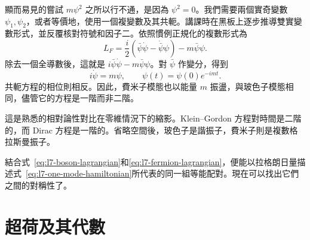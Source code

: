 \begin{classroomqa}
\end{classroomqa}

顯而易見的嘗試 \(m\psi^2\) 之所以行不通，是因為 \(\psi^2=0\)。我們需要兩個實奇變數 \(\psi_1,\psi_2\)，或者等價地，使用一個複變數及其共軛。講課時在黑板上逐步推導雙實變數形式，並反覆核對符號和因子二。依照慣例正規化的複數形式為
\begin{equation}
L_F=\frac{i}{2}
\left(\bar\psi\dot\psi-\dot{\bar\psi}\psi\right)
-m\bar\psi\psi.
\label{eq:l7-fermion-lagrangian}
\end{equation}
除去一個全導數後，這就是 \(i\bar\psi\dot\psi-m\bar\psi\psi\)。對 \(\bar\psi\) 作變分，得到
\begin{equation}
i\dot\psi=m\psi,
\qquad
\psi(t)=\psi(0)e^{-imt}.
\label{eq:l7-fermion-eom}
\end{equation}
共軛方程的相位則相反。因此，費米子模態也以能量 \(m\) 振盪，與玻色子模態相同，儘管它的方程是一階而非二階。


這是熟悉的相對論性對比在零維情況下的縮影。Klein--Gordon 方程對時間是二階的，而 Dirac 方程是一階的。省略空間後，玻色子是諧振子，費米子則是複數格拉斯曼振子。

\begin{classroomqa}
\end{classroomqa}

結合式~\eqref{eq:l7-boson-lagrangian}和\eqref{eq:l7-fermion-lagrangian}，便能以拉格朗日量描述式~\eqref{eq:l7-one-mode-hamiltonian}所代表的同一組等能配對。現在可以找出它們之間的對稱性了。

\section{超荷及其代數}

